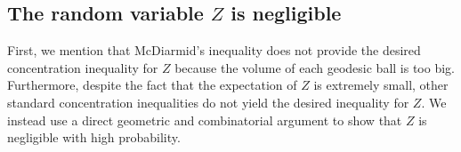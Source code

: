 
\subsection{The random variable $Z$ is negligible}\label{Znegligiblesection}

First, we mention that McDiarmid's inequality does not provide the desired concentration inequality for $ Z $ because the volume of each geodesic ball is too big. Furthermore, despite the fact that the expectation of $Z$ is extremely small, other standard concentration inequalities  do not yield the desired inequality for $Z$. We  instead use a direct geometric and combinatorial argument to show that $ Z $ is negligible with high probability. %

